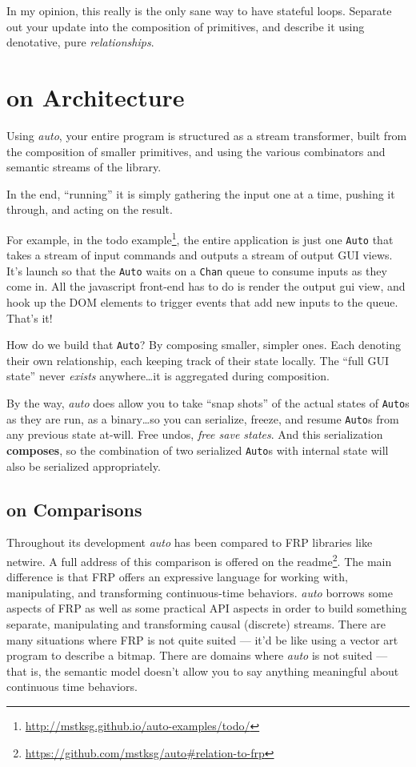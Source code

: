 \documentclass[]{article}
\renewcommand{\href}[2]{#2\footnote{\url{#1}}}
\begin{document}
In my opinion, this really is the only sane way to have stateful loops.
Separate out your update into the composition of primitives, and
describe it using denotative, pure \emph{relationships}.

\section{on Architecture}\label{on-architecture}

Using \emph{auto}, your entire program is structured as a stream
transformer, built from the composition of smaller primitives, and using
the various combinators and semantic streams of the library.

In the end, ``running'' it is simply gathering the input one at a time,
pushing it through, and acting on the result.

For example, in the
\href{http://mstksg.github.io/auto-examples/todo/}{todo example}, the
entire application is just one \texttt{Auto} that takes a stream of
input commands and outputs a stream of output GUI views. It's launch so
that the \texttt{Auto} waits on a \texttt{Chan} queue to consume inputs
as they come in. All the javascript front-end has to do is render the
output gui view, and hook up the DOM elements to trigger events that add
new inputs to the queue. That's it!

How do we build that \texttt{Auto}? By composing smaller, simpler ones.
Each denoting their own relationship, each keeping track of their state
locally. The ``full GUI state'' never \emph{exists} anywhere\ldots{}it
is aggregated during composition.

By the way, \emph{auto} does allow you to take ``snap shots'' of the
actual states of \texttt{Auto}s as they are run, as a binary\ldots{}so
you can serialize, freeze, and resume \texttt{Auto}s from any previous
state at-will. Free undos, \emph{free save states}. And this
serialization \textbf{composes}, so the combination of two serialized
\texttt{Auto}s with internal state will also be serialized
appropriately.

\subsection{on Comparisons}\label{on-comparisons}

Throughout its development \emph{auto} has been compared to FRP
libraries like netwire. A full address of this comparison is offered on
\href{https://github.com/mstksg/auto\#relation-to-frp}{the readme}. The
main difference is that FRP offers an expressive language for working
with, manipulating, and transforming continuous-time behaviors.
\emph{auto} borrows some aspects of FRP as well as some practical API
aspects in order to build something separate, manipulating and
transforming causal (discrete) streams. There are many situations where
FRP is not quite suited --- it'd be like using a vector art program to
describe a bitmap. There are domains where \emph{auto} is not suited ---
that is, the semantic model doesn't allow you to say anything meaningful
about continuous time behaviors.
\end{document}
